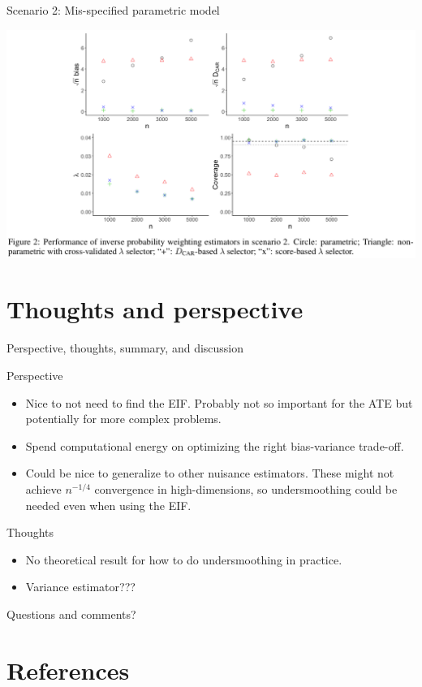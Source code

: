 \documentclass[smaller]{beamer}\usepackage{listings}
\begin{document}
\begin{frame}[label={sec:org113addb}]{Scenario 2: Mis-specified parametric model}
\begin{center}
\includegraphics[width=1\textwidth]{./screenshots/scenario2.png}
\end{center}
\end{frame}

\section{Thoughts and perspective}
\label{sec:orgd4fb3d3}
\begin{frame}[label={sec:orgc68e53d}]{Perspective, thoughts, summary, and discussion}
\begin{block}{Perspective}
\begin{itemize}
\item Nice to not need to find the EIF. Probably not so important for the ATE but potentially for more
complex problems.
\item Spend computational energy on optimizing the right bias-variance trade-off.
\item Could be nice to generalize to other nuisance estimators. These might not achieve \(n^{-1/4}\)
convergence in high-dimensions, so undersmoothing could be needed even when using the EIF.
\end{itemize}
\pause
\end{block}
\begin{block}{Thoughts}
\begin{itemize}
\item No theoretical result for how to do undersmoothing in practice.
\item Variance estimator???
\end{itemize}
\pause
\end{block}
\begin{block}{Questions and comments?}
\end{block}
\end{frame}
\section{References}
\label{sec:orga92c697}

\end{document}

